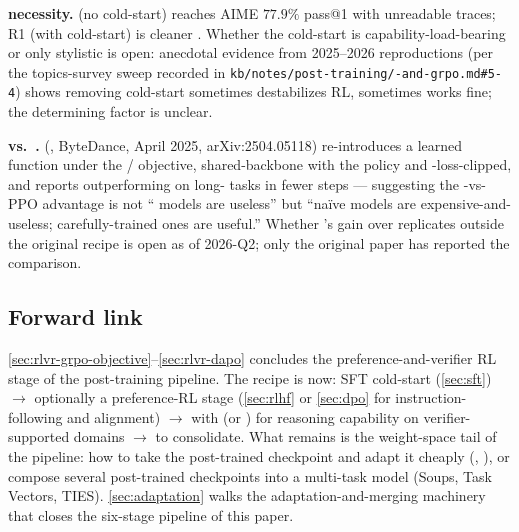 \begin{contradiction}
\textbf{ necessity.}  (no cold-start) reaches AIME
$77.9\%$ pass@1 with unreadable traces; R1 (with cold-start) is cleaner
\citep[\S 3]{deepseek-r1}. Whether the cold-start is
capability-load-bearing or only stylistic is open: anecdotal evidence
from 2025--2026 reproductions (per the topics-survey sweep recorded in
\texttt{kb/notes/post-training/-and-grpo.md\#5-4}) shows removing
cold-start sometimes destabilizes RL, sometimes works fine; the
determining factor is unclear.
\end{contradiction}

\begin{contradiction}
\textbf{ vs.\ .}  (, ByteDance, April
2025, arXiv:2504.05118) re-introduces a learned 
function under the / objective, shared-backbone with the
policy and -loss-clipped, and reports outperforming  on
long- tasks in fewer steps — suggesting the -vs-PPO advantage is
not `` models are useless'' but ``na\"ive  models are
expensive-and-useless; carefully-trained ones are useful.'' Whether
's gain over  replicates outside the original recipe is open as
of 2026-Q2; only the original paper has reported the comparison.
\end{contradiction}

\subsection{Forward link}
\label{sec:rlvr-forward}

\cref{sec:rlvr-grpo-objective}--\cref{sec:rlvr-dapo} concludes the
preference-and-verifier RL stage of the post-training pipeline.
The recipe is now: SFT cold-start (\cref{sec:sft})
$\to$ optionally a preference-RL stage (\cref{sec:rlhf} or
\cref{sec:dpo} for instruction-following and alignment)
$\to$  with  (or ) for reasoning capability on
verifier-supported domains $\to$  to consolidate.
What remains is the weight-space tail of the pipeline: how to take the
post-trained checkpoint and adapt it cheaply (, ), or compose
several post-trained checkpoints into a multi-task model (Soups, Task
Vectors, TIES). \cref{sec:adaptation} walks the adaptation-and-merging
machinery that closes the six-stage pipeline of this paper.
